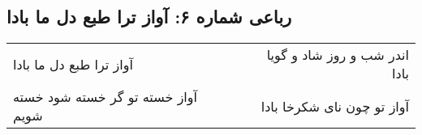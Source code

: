 \begin{center}
\section*{رباعی شماره ۶: آواز ترا طبع دل ما بادا}
\label{sec:0006}
\begin{longtable}{l p{0.5cm} r}
آواز ترا طبع دل ما بادا
&&
اندر شب و روز شاد و گویا بادا
\\
آواز خسته تو گر خسته شود خسته شویم
&&
آواز تو چون نای شکرخا بادا
\\
\end{longtable}
\end{center}
